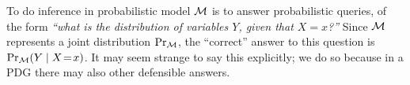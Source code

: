 \documentclass[twoside]{article}
\begin{document}
%
To do inference in probabilistic model $\cal M$ is to answer probabilistic queries, of the form
\textit{``what is the distribution of variables $Y$, given that $X\!=\!x$?''}
%
Since $\cal M$ represents a joint distribution $\Pr_{\cal M}$,
the ``correct'' answer to this question is $\Pr_{\cal M}(Y \mid X\!=\!x)$.
It may seem strange to say this explicitly; we do so because
in a PDG there may also other defensible answers.
\end{document}
